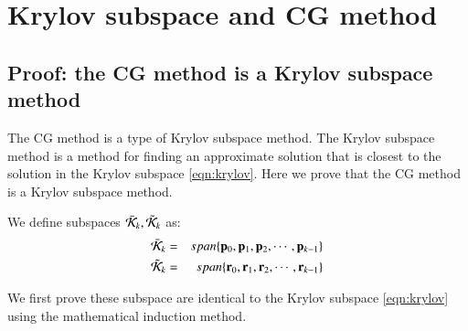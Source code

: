 











\section{Krylov subspace and CG method}




\subsection{Proof: the CG method is a Krylov subspace method}

The CG method is a type of Krylov subspace method.
%
The Krylov subspace method is a method for finding an approximate solution that is closest to the solution in the Krylov subspace \eqref{eqn:krylov}.
%
Here we prove that the CG method is a Krylov subspace method.



We define subspaces $\bar{\cal K}_k,\tilde{\cal K}_k$ as:
%
\begin{eqnarray}
\bar{\cal K}_k &=&span\{\mathbf{p}_0,\mathbf{p}_1,\mathbf{p}_2,\cdots,\mathbf{p}_{k-1}\}\\
\tilde{\cal K}_k&=&span\{\mathbf{r}_0,\mathbf{r}_1,\mathbf{r}_2,\cdots,\mathbf{r}_{k-1}\}
\end{eqnarray}

We first prove these subspace are identical to the Krylov subspace \eqref{eqn:krylov} using the mathematical induction method.

